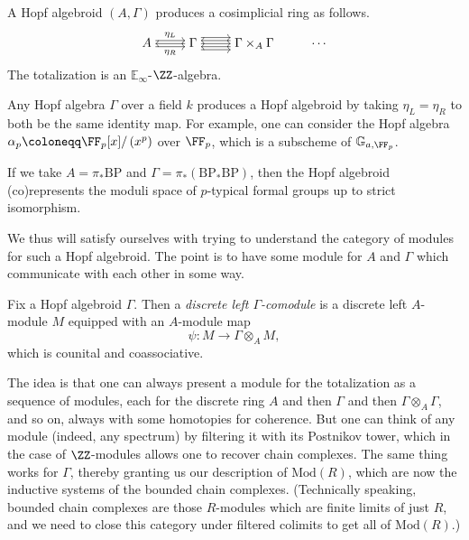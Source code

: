 \documentclass[../notes.tex]{subfiles}
\begin{document}
\begin{remark}
	A Hopf algebroid $(A,\Gamma)$ produces a cosimplicial ring as follows.
	\[\begin{tikzcd}[cramped]
		A & \Gamma & {\Gamma\times_A\Gamma} & \cdots
		\arrow["{\eta_L}", shift left, from=1-1, to=1-2]
		\arrow["{\eta_R}"', shift right, from=1-1, to=1-2]
		\arrow[from=1-2, to=1-1]
		\arrow[from=1-2, to=1-3]
		\arrow[shift left=2, from=1-2, to=1-3]
		\arrow[shift right=2, from=1-2, to=1-3]
		\arrow[shift left, from=1-3, to=1-2]
		\arrow[shift right, from=1-3, to=1-2]
	\end{tikzcd}\]
	The totalization is an $\mathbb E_\infty$-$\ZZ$-algebra.
\end{remark}
\begin{example}
	Any Hopf algebra $\Gamma$ over a field $k$ produces a Hopf algebroid by taking $\eta_L=\eta_R$ to both be the same identity map. For example, one can consider the Hopf algebra $\alpha_p\coloneqq\FF_p[x]/\left(x^p\right)$ over $\FF_p$, which is a subscheme of $\mathbb G_{a,\FF_p}$.
\end{example}
\begin{example}
	If we take $A=\pi_*\mathrm{BP}$ and $\Gamma=\pi_*(\mathrm{BP}_*\mathrm{BP})$, then the Hopf algebroid (co)represents the moduli space of $p$-typical formal groups up to strict isomorphism.
\end{example}
We thus will satisfy ourselves with trying to understand the category of modules for such a Hopf algebroid. The point is to have some module for $A$ and $\Gamma$ which communicate with each other in some way.
\begin{definition}[module]
	Fix a Hopf algebroid $\Gamma$. Then a \textit{discrete left $\Gamma$-comodule} is a discrete left $A$-module $M$ equipped with an $A$-module map
	\[\psi\colon M\to\Gamma\otimes_AM,\]
	which is counital and coassociative.
\end{definition}
\begin{remark}
	The idea is that one can always present a module for the totalization as a sequence of modules, each for the discrete ring $A$ and then $\Gamma$ and then $\Gamma\otimes_A\Gamma$, and so on, always with some homotopies for coherence. But one can think of any module (indeed, any spectrum) by filtering it with its Postnikov tower, which in the case of $\ZZ$-modules allows one to recover chain complexes. The same thing works for $\Gamma$, thereby granting us our description of $\mathrm{Mod}(R)$, which are now the inductive systems of the bounded chain complexes. (Technically speaking, bounded chain complexes are those $R$-modules which are finite limits of just $R$, and we need to close this category under filtered colimits to get all of $\mathrm{Mod}(R)$.)
\end{remark}
\end{document}
